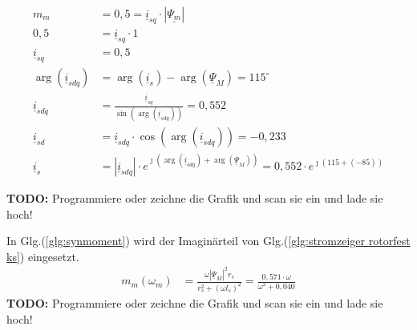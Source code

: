 \begin{solution}
\begin{compactenum}
\begin{align}
m_m &= 0,5 = \underline{i}_{sq} \cdot |\underline{\Psi_m}|\\
0,5 &= \underline{i}_{sq} \cdot 1\\
\underline{i}_{sq} &= 0,5\\
\arg(\underline{i}_{sdq}) &= \arg(\underline{i}_{s}) -\arg(\underline{\Psi}_{M})=115^\circ\\
\underline{i}_{sdq} &= \frac{\underline{i}_{sq}}{\sin(\arg(\underline{i}_{sdq}))}= 0,552\\
\underline{i}_{sd} &= \underline{i}_{sdq} \cdot \cos(\arg(\underline{i}_{sdq})) = -0,233\\
\underline{i}_{s} &= |\underline{i}_{sdq}| \cdot e^{\jmath (\arg(\underline{i}_{sdq}) + \arg(\underline{\Psi}_{M}))}= 0,552 \cdot e^{\jmath ( 115 + (-85))}
\end{align}
\item \textbf{TODO:} Programmiere oder zeichne die Grafik und scan sie ein und lade sie hoch!
\item In Glg.(\ref{glg:synmoment}) wird der Imaginärteil von Glg.(\ref{glg:stromzeiger rotorfest ks}) eingesetzt.
\begin{align}
m_m(\omega_m) &= \frac{\omega |\underline{\Psi}_M|^2 r_s}{r_s^2 + (\omega l_s)^2}=\frac{0,571 \cdot \omega}{\omega^2 + 0,040}
\end{align}
\textbf{TODO:} Programmiere oder zeichne die Grafik und scan sie ein und lade sie hoch!
\end{compactenum}
\end{solution}